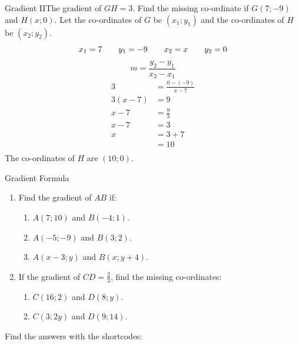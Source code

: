 \begin{wex}{Gradient II}{The gradient of $GH = 3$. Find the missing co-ordinate if $G(7;-9)$ and $H(x;0)$.}{
Let the co-ordinates of $G$ be $(x_1;y_1)$ and the co-ordinates of $H$ be $(x_2;y_2)$.
\begin{equation*}
 x_1 = 7 \hskip2em y_1 = -9 \hskip2em x_2 = x \hskip2em y_2 = 0
\end{equation*}
\begin{equation*}
 m = \frac{y_2 - y_1}{x_2 - x_1}
\end{equation*}
\begin{equation*}
 \begin{array}{cl}
  3 &= \frac{0 - (-9)}{x - 7}\\
  3(x-7)&= 9\\
  x-7 &= \frac{9}{3}\\
  x-7 &= 3\\
  x &= 3 + 7\\
  &= 10 \\
 \end{array}
\end{equation*}
The co-ordinates of $H$ are $(10;0)$.
\vspace{2pt}
    \vspace{.1in}
}
\end{wex}
\begin{exercises}{Gradient Formula}
 \begin{enumerate}
  \item Find the gradient of $AB$ if:
  \begin{enumerate}
   \item $A(7;10)$ and $B(-4;1)$.
   \item $A(-5;-9)$ and $B(3;2)$.
   \item $A(x-3;y)$ and $B(x;y+4)$.
  \end{enumerate}
  
  \item If the gradient of $CD=\frac{2}{3}$, find the missing co-ordinates:
  \begin{enumerate}
   \item $C(16;2)$ and $D(8;y)$.
   \item $C(3;2y)$ and $D(9;14)$.
  \end{enumerate}
 \end{enumerate}

 Find the answers with the shortcodes:
\end{exercises}
